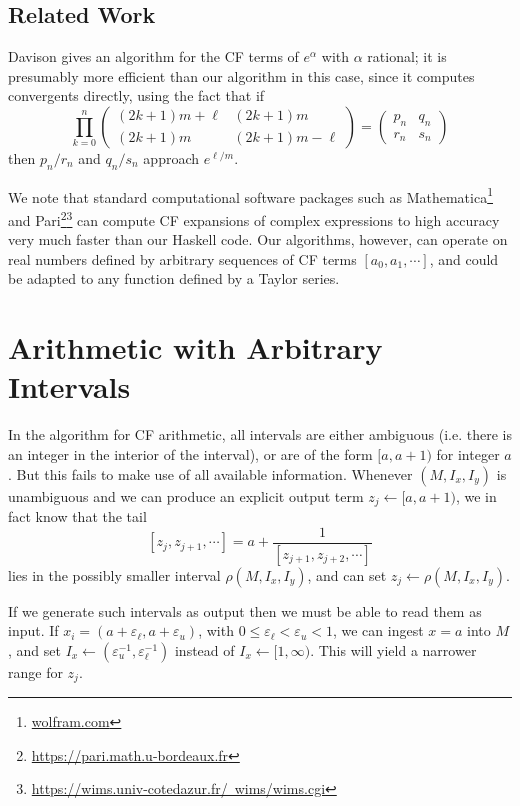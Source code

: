 \documentclass[11pt, oneside]{amsart}   	%
\renewcommand{\:}{\negthickspace:\negthickspace}
\begin{document}
\subsection{Related Work}
Davison \cite{DavisonCFexp} gives an algorithm for the CF terms of $e^{\alpha}$ with $\alpha$ rational;
it is presumably more efficient than our algorithm in this case, since it computes convergents directly, using the fact that if
\[
\prod_{k=0}^n \begin{pmatrix} (2k+1)m+\ell & (2k+1)m \\
                                                       (2k+1)m &  (2k+1)m-\ell \end{pmatrix} = \begin{pmatrix} p_n & q_n \\
                                                                                                                                             r_n & s_n \end{pmatrix}
\]
then $p_n/r_n$ and $q_n/s_n$ approach $e^{\ell/m}$.


We note that standard computational software packages such as Mathematica\footnote{\href{wolfram.com}{wolfram.com}} and Pari\footnote{\href{https://pari.math.u-bordeaux.fr}{https://pari.math.u-bordeaux.fr}}\footnote{\href{https://wims.univ-cotedazur.fr/~wims/wims.cgi}{https://wims.univ-cotedazur.fr/~wims/wims.cgi}} can compute CF expansions of complex expressions to high accuracy very much faster than our Haskell code.
Our algorithms, however, can operate on real numbers defined by arbitrary sequences of CF terms $[a_0,a_1,\cdots]$,
and could be adapted to any function defined by a Taylor series.


\section{Arithmetic with Arbitrary Intervals}
In the algorithm for CF arithmetic, all intervals are either ambiguous (i.e. there is an integer in the interior of the interval), or are of the form $[a,a+1)$ for integer $a$. But this fails to make use of all available information.
Whenever $(M,I_x, I_y)$ is unambiguous and we can produce an explicit output term $z_j \leftarrow [a,a+1)$, we in fact know that the tail 
\[
[z_j, z_{j+1},\cdots] = a + \frac{1}{[z_{j+1}, z_{j+2},\cdots]}
\]
lies in the possibly smaller interval $\rho(M,I_x, I_y)$, and can set $z_j \leftarrow \rho(M,I_x, I_y)$.

If we generate such intervals as output then we must be able to read them as input. If $x_i = (a+\varepsilon_\ell, a+\varepsilon_u)$, with $0 \leq \varepsilon_\ell < \varepsilon_u <1$, we can ingest $x=a$ into $M$, and set $I_x \leftarrow (\varepsilon_u^{-1}, \varepsilon_\ell^{-1})$ instead of $I_x \leftarrow [1,\infty)$. This will yield a narrower range for $z_j$.
\end{document}
